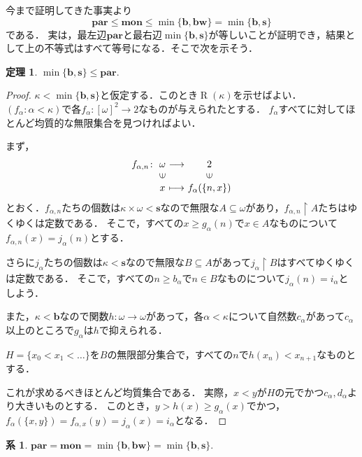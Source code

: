 \documentclass[uplatex,dvipdfmx]{jsarticle}
\renewcommand\subset{\subseteq}
\theoremstyle{definition}
\newtheorem*{thm*}{定理}
\newtheorem*{cor*}{系}
\theoremstyle{named}
\begin{document}
今まで証明してきた事実より
\[
\mathbf{par} \le \mathbf{mon} \le \min\{\mathbf{b}, \mathbf{bw}\} = \min\{\mathbf{b}, \mathbf{s}\}
\]
である．
実は，最左辺$\mathbf{par}$と最右辺$\min\{\mathbf{b}, \mathbf{s}\}$が等しいことが証明でき，結果として上の不等式はすべて等号になる．そこで次を示そう．


\begin{framed}
\begin{thm*}
$\min\{\mathbf{b}, \mathbf{s}\} \le \mathbf{par}$.
\end{thm*}
\end{framed}
\begin{proof}
$\kappa < \min\{\mathbf{b}, \mathbf{s}\}$と仮定する．このとき$\operatorname{R}(\kappa)$を示せばよい．
$(f_\alpha : \alpha < \kappa)$で各$f_\alpha : [\omega]^2 \to 2$なものが与えられたとする．
$f_\alpha$すべてに対してほとんど均質的な無限集合を見つければよい．

まず，
\[
\begin{array}{r@{\,\,}c@{\,\,}c@{\,\,}c}
f_{\alpha,n}\colon&\omega&\longrightarrow&2\\
&\rotatebox{90}{$\in$}&&\rotatebox{90}{$\in$}\\
&x&\longmapsto&f_\alpha(\{n, x\})
\end{array}
\]
とおく．$f_{\alpha,n}$たちの個数は$\kappa \times \omega < \mathbf{s}$なので無限な$A \subset \omega$があり，$f_{\alpha,n} \upharpoonright A$たちはゆくゆくは定数である．
そこで，すべての$x \ge g_{\alpha}(n)$で$x \in A$なものについて$f_{\alpha, n}(x) = j_\alpha(n)$とする．

さらに$j_\alpha$たちの個数は$\kappa < \mathbf{s}$なので無限な$B \subset A$があって$j_\alpha \upharpoonright B$はすべてゆくゆくは定数である．
そこで，すべての$n \ge b_\alpha$で$n \in B$なものについて$j_\alpha(n) = i_\alpha$としよう．

また，$\kappa < \mathbf{b}$なので関数$h: \omega \to \omega$があって，各$\alpha < \kappa$について自然数$c_\alpha$があって$c_\alpha$以上のところで$g_\alpha$は$h$で抑えられる．

$H = \{x_0 < x_1 < \dots \}$を$B$の無限部分集合で，すべての$n$で$h(x_n) < x_{n+1}$なものとする．

これが求めるべきほとんど均質集合である．
実際，$x <  y$が$H$の元でかつ$c_\alpha, d_\alpha$より大きいものとする．
このとき，$y > h(x) \ge g_\alpha(x)$でかつ，$f_\alpha(\{x, y\}) = f_{\alpha, x}(y) = j_\alpha(x) = i_\alpha$となる．
\end{proof}


\begin{framed}
\begin{cor*}
$\mathbf{par} = \mathbf{mon} = \min\{\mathbf{b}, \mathbf{bw}\} = \min\{\mathbf{b}, \mathbf{s}\}$.
\end{cor*}
\end{framed}
\end{document}
